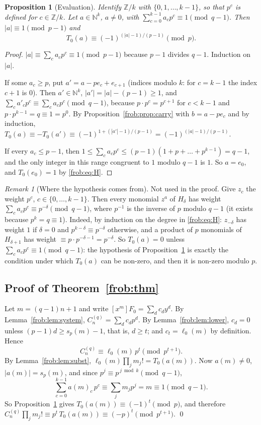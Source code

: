 \documentclass[11pt]{article}
\newtheorem{proposition}[theorem]{Proposition}
\theoremstyle{definition}
\theoremstyle{remark}
\newtheorem{remark}[theorem]{Remark}
\numberwithin{equation}{section}
\numberwithin{figure}{section}
\newcommand{\Z}{\mathbb Z}
\newcommand{\N}{\mathbb N}
\newcommand{\C}{C_n^{(q)}}
\begin{document}
\begin{proposition}[Evaluation]\label{frob:prop:eval}
Identify $\Z/k$ with $\{0,1,\dots,k-1\}$, so that $p^c$ is defined for $c\in\Z/k$.
Let $a\in\N^k$, $a\ne0$, with $\sum_{c=0}^{k-1}a_cp^c\equiv1\pmod{q-1}$. Then
$|a|\equiv1\pmod{p-1}$ and
\[
 T_0(a)\equiv(-1)^{(|a|-1)/(p-1)}\pmod p .
\]
\end{proposition}

\begin{proof}
$|a|\equiv\sum_ca_cp^c\equiv1\pmod{p-1}$ because $p-1$ divides $q-1$. Induction on $|a|$.

If some $a_c\ge p$, put $a'=a-pe_c+e_{c+1}$ (indices modulo $k$: for $c=k-1$ the index
$c+1$ is $0$). Then $a'\in\N^k$,
$|a'|=|a|-(p-1)\ge1$, and $\sum_ca'_cp^c\equiv\sum_ca_cp^c\pmod{q-1}$, because
$p\cdot p^c=p^{c+1}$ for $c<k-1$ and $p\cdot p^{k-1}=q\equiv1=p^0$. By
Proposition~\ref{frob:prop:carry} with $b=a-pe_c$ and by induction,
$T_0(a)\equiv-T_0(a')\equiv(-1)^{1+(|a'|-1)/(p-1)}=(-1)^{(|a|-1)/(p-1)}$.

If every $a_c\le p-1$, then $1\le\sum_ca_cp^c\le(p-1)(1+p+\dots+p^{k-1})=q-1$, and the only
integer in this range congruent to $1$ modulo $q-1$ is $1$. So $a=e_0$, and $T_0(e_0)=1$ by
\eqref{frob:eq:H}.
\end{proof}

\begin{remark}[Where the hypothesis comes from]\label{frob:rem:support}
Not used in the proof. Give $z_c$ the weight $p^c$, $c\in\{0,\dots,k-1\}$. Then every monomial
$z^a$ of $H_\delta$ has weight $\sum_ca_cp^c\equiv p^{-\delta}\pmod{q-1}$, where $p^{-1}$ is
the inverse of $p$ modulo $q-1$ (it exists because $p^k=q\equiv1$). Indeed, by induction on
the degree in \eqref{frob:eq:H}: $z_{-\delta}$ has weight $1$ if $\delta=0$ and
$p^{k-\delta}\equiv p^{-\delta}$ otherwise, and a product of $p$ monomials of $H_{\delta+1}$
has weight $\equiv p\cdot p^{-\delta-1}=p^{-\delta}$. So $T_0(a)=0$ unless
$\sum_ca_cp^c\equiv1\pmod{q-1}$: the hypothesis of Proposition~\ref{frob:prop:eval} is exactly
the condition under which $T_0(a)$ can be non-zero, and then it is non-zero modulo $p$.
\end{remark}

\subsection{Proof of Theorem~\ref{frob:thm}}

Let $m=(q-1)n+1$ and write $[x^m]F_0=\sum_dc_dy^d$. By Lemma~\ref{frob:lem:system},
$\C=\sum_dc_dp^d$. By Lemma~\ref{frob:lem:lower}, $c_d=0$ unless $(p-1)d\ge s_p(m)-1$, that is,
$d\ge t$; and $c_t=\ell_0(m)$ by definition. Hence
\[
 \C\equiv\ell_0(m)\,p^t\pmod{p^{t+1}} .
\]
By Lemma~\ref{frob:lem:subst}, $\ell_0(m)\prod_jm_j!=T_0(a(m))$. Now $a(m)\ne0$,
$|a(m)|=s_p(m)$, and since $p^j\equiv p^{\,j\bmod k}\pmod{q-1}$,
\[
 \sum_{c=0}^{k-1}a(m)_c\,p^c\equiv\sum_jm_jp^j=m\equiv1\pmod{q-1}.
\]
So Proposition~\ref{frob:prop:eval} gives $T_0(a(m))\equiv(-1)^t\pmod p$, and therefore
$\C\prod_jm_j!\equiv p^t\,T_0(a(m))\equiv(-p)^t\pmod{p^{t+1}}$. \qed
\end{document}
